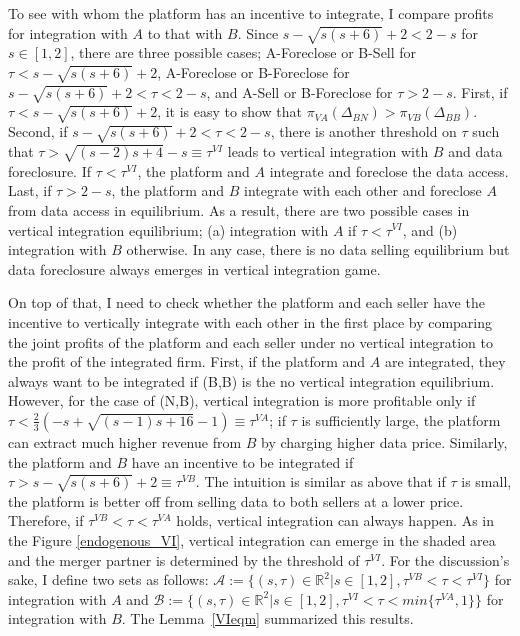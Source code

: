 \documentclass[12pt]{article}
\begin{document}
To see with whom the platform has an incentive to integrate, I compare profits for integration with $A$ to that with $B$. Since $s-\sqrt{s (s+6)}+2<2-s$ for $s\in[1,2]$, there are three possible cases; A-Foreclose or B-Sell for $\tau<s-\sqrt{s (s+6)}+2$, A-Foreclose or B-Foreclose for $s-\sqrt{s (s+6)}+2<\tau<2-s$, and A-Sell or B-Foreclose for $\tau>2-s$. First, if $\tau<s-\sqrt{s (s+6)}+2$, it is easy to show that $\pi_{VA}(\Delta_{BN})>\pi_{VB}(\Delta_{BB})$. Second, if $s-\sqrt{s (s+6)}+2<\tau<2-s$, there is another threshold on $\tau$ such that $\tau>\sqrt{(s-2) s+4}-s \equiv\tau^{VI}  $ leads to vertical integration with $B$ and data foreclosure. If $\tau<\tau^{VI}  $, the platform and $A$ integrate and foreclose the data access. Last, if $\tau>2-s$, the platform and $B$ integrate with each other and foreclose $A$ from data access in equilibrium. As a result, there are two possible cases in vertical integration equilibrium; (a) integration with $A$ if $\tau<\tau^{VI} $, and (b) integration with $B$ otherwise. In any case, there is no data selling equilibrium but data foreclosure always emerges in vertical integration game. 

On top of that, I need to check whether the platform and each seller have the incentive to vertically integrate with each other in the first place by comparing the joint profits of the platform and each seller under no vertical integration to the profit of the integrated firm. First, if the platform and $A$ are integrated, they always want to be integrated if (B,B) is the no vertical integration equilibrium. However, for the case of (N,B), vertical integration is more profitable only if $\tau<\frac{2}{3} \left(-s+\sqrt{(s-1) s+16}-1\right) \equiv \tau^{VA}$; if $\tau$ is sufficiently large, the platform can extract much higher revenue from $B$ by charging higher data price. Similarly, the platform and $B$ have an incentive to be integrated if $\tau>s-\sqrt{s (s+6)}+2 \equiv \tau^{VB}$. The intuition is similar as above that if $\tau$ is small, the platform is better off from selling data to both sellers at a lower price. Therefore, if $\tau^{VB}<\tau<\tau^{VA}$ holds, vertical integration can always happen. As in the Figure \ref{endogenous_VI}, vertical integration can emerge in the shaded area and the merger partner is determined by the threshold of $\tau^{VI}$. For the discussion's sake, I define two sets as follows: $\mathcal{A} := \{(s,\tau) \in \mathbb{R}^2|s\in[1,2], \tau^{VB}<\tau<\tau^{VI}\}$ for integration with $A$ and $\mathcal{B} := \{(s,\tau) \in  \mathbb{R}^2|s\in[1,2], \tau^{VI}<\tau<min\{\tau^{VA},1\}\}$ for integration with $B$. The Lemma~\ref{VIeqm} summarized this results. 
\end{document}
